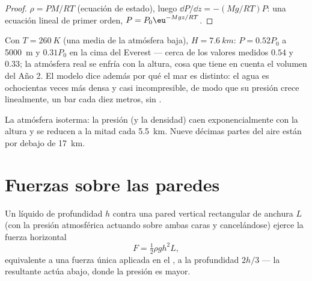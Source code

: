 \begin{proof}
$\rho = PM/RT$ (ecuación de estado), luego $\dd P/\dd z = -(Mg/RT)P$: una
ecuación lineal de primer orden, $P = P_0\eu^{-Mgz/RT}$.
\end{proof}

\begin{example}\label{ex:b1:fluid-statics:altitude}
Con $T = \qty{260}{K}$ (una media de la atmósfera baja), $H =
\qty{7.6}{km}$: $P = 0.52P_0$ a \qty{5000}{m} y $0.31P_0$ en la cima del
Everest --- cerca de los valores medidos $0.54$ y $0.33$; la atmósfera real
se enfría con la altura, cosa que tiene en cuenta el volumen del Año 2. El
modelo dice además por qué el mar es distinto: el agua es ochocientas
veces más densa y casi incompresible, de modo que su presión crece
linealmente, un bar cada diez metros, sin .
\end{example}

\begin{omfigure}

{\small La atmósfera isoterma: la presión (y la densidad) caen
exponencialmente con la altura y se reducen a la mitad cada \qty{5.5}{km}.
Nueve décimas partes del aire están por debajo de \qty{17}{km}.}
\end{omfigure}

\section{Fuerzas sobre las paredes}

\begin{proposition}\label{prop:b1:fluid-statics:wall}
Un líquido de profundidad $h$ contra una pared vertical rectangular de
anchura $L$ (con la presión atmosférica actuando sobre ambas caras y
cancelándose) ejerce la fuerza horizontal
\[
F = \tfrac12\rho gh^2L ,
\]
equivalente a una fuerza única aplicada en el \emph{}, a
la profundidad $2h/3$ --- la resultante actúa abajo, donde la presión es
mayor.
\end{proposition}

